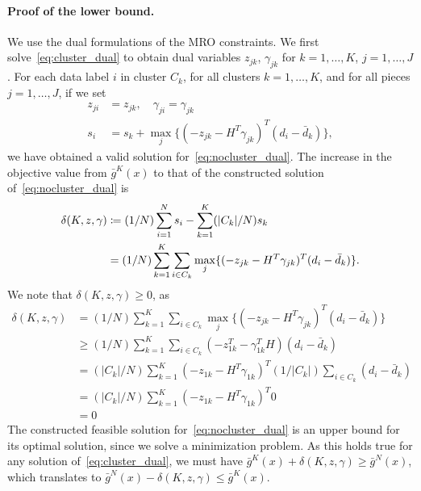 \documentclass[12pt]{article}
\theoremstyle{thmstyleone}%
\theoremstyle{thmstyletwo}%
\theoremstyle{thmstylethree}%
\begin{document}
\begin{appendices}
{\paragraph{Proof of the lower bound.}
We use the dual formulations of the \gls{MRO} constraints. We first solve~\eqref{eq:cluster_dual} to obtain dual variables $z_{jk}$, $\gamma_{jk}$ for $k = 1,\dots,K$, $j = 1,\dots,J$. For each data label $i$ in cluster $C_k$, for all clusters $k = 1,\dots,K$, and for all pieces $j = 1,\dots, J$, if we set
\begin{equation*}
	\begin{aligned}
		z_{ji} &= z_{jk}, \quad \gamma_{ji} = \gamma_{jk}\\
		s_i &= s_k + \max_j\{(-z_{jk} - H^T\gamma_{jk})^T (d_i - \bar{d}_k)\},
	\end{aligned}
\end{equation*}
we have obtained a valid solution for~\eqref{eq:nocluster_dual}. The increase in the objective value from $\bar{g}^K(x)$ to that of the constructed solution of~\eqref{eq:nocluster_dual} is
\begin{equation*}
	\begin{aligned}
		\delta(K,z,\gamma) & \coloneqq (1/N)\sum_{i=1}^N s_i - \sum_{k=1}^K(|C_k|/N)s_k \\
		&= (1/N)\sum_{k = 1}^K\sum_{i\in C_k} \max_j\{(-z_{jk} - H^T\gamma_{jk})^T(d_i - \bar{d}_k)\}.
	\end{aligned}
\end{equation*}
We note that $\delta(K,z,\gamma) \geq 0$, as
\begin{equation*}
	\begin{aligned}
		\delta(K,z,\gamma) &= (1/N)\sum_{k = 1}^K\sum_{i\in C_k} \max_j\{(-z_{jk} - H^T\gamma_{jk})^T(d_i - \bar{d}_k)\}\\
		&\geq (1/N)\sum_{k = 1}^K\sum_{i\in C_k} (-z_{1k}^T - \gamma_{1k}^TH)(d_i - \bar{d}_k)\\
		& = (|C_k|/N)\sum_{k = 1}^K  (-z_{1k} - H^T\gamma_{1k})^T (1/|C_k|)\sum_{i\in C_k} (d_i - \bar{d}_k)\\
		&= (|C_k|/N) \sum_{k = 1}^K  (-z_{1k} - H^T\gamma_{1k})^T0\\
		&= 0
	\end{aligned}
\end{equation*}
The constructed feasible solution for~\eqref{eq:nocluster_dual} is an upper bound for its optimal solution, since we solve a minimization problem. As this holds true for any solution of~\eqref{eq:cluster_dual}, we must have $\bar{g}^K(x) + \delta(K,z,\gamma) \geq \bar{g}^N(x)$, which translates to $\bar{g}^N(x) - \delta(K,z,\gamma) \leq \bar{g}^K(x)$.
}
\end{appendices}
\end{document}
